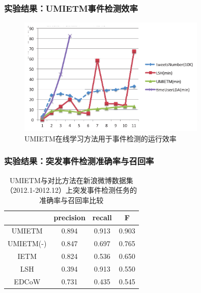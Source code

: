 \begin{frame}
\frametitle{实验结果：UMIETM事件检测效率}
\begin{figure}
	\caption{UMIETM在线学习方法用于事件检测的运行效率}
    \includegraphics[width=0.8\textwidth]{img/UMIETM/efficiencyCompareWithLSH.pdf}
\end{figure}
\end{frame}

\begin{frame}
\frametitle{实验结果：突发事件检测准确率与召回率}

\begin{table}
\centering
\caption{UMIETM与对比方法在新浪微博数据集（2012.1-2012.12）上突发事件检测任务的准确率与召回率比较}
\begin{tabular}{|c|c|c|c|} \hline
 & precision & recall & F \\ \hline
UMIETM & 0.894 & 0.913 & 0.903\\ \hline
UMIETM(-) & 0.847 & 0.697 & 0.765\\ \hline
IETM & 0.824 & 0.536 & 0.650\\ \hline
LSH & 0.394 & 0.913 & 0.550\\ \hline
EDCoW & 0.731 & 0.435 & 0.545\\ \hline
\end{tabular}
\label{tab:metrics}
\end{table}
\end{frame}

